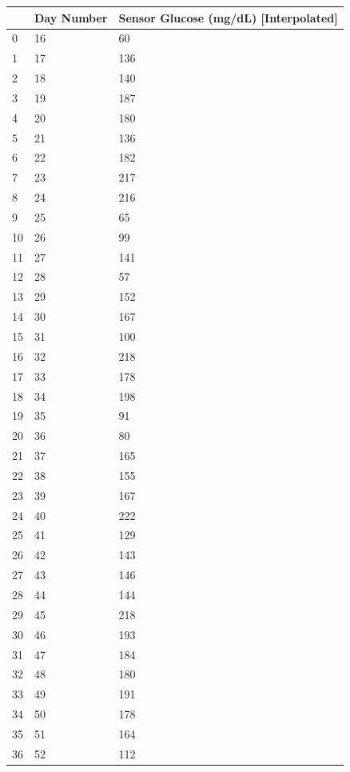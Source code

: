 \bigskip\noindent
\begin{tabular}{p{}p{}p{}}
\toprule
 & Day Number & Sensor Glucose (mg/dL) [Interpolated] \\
\hline
0 & 16 & 60 \\
\hline
1 & 17 & 136 \\
\hline
2 & 18 & 140 \\
\hline
3 & 19 & 187 \\
\hline
4 & 20 & 180 \\
\hline
5 & 21 & 136 \\
\hline
6 & 22 & 182 \\
\hline
7 & 23 & 217 \\
\hline
8 & 24 & 216 \\
\hline
9 & 25 & 65 \\
\hline
10 & 26 & 99 \\
\hline
11 & 27 & 141 \\
\hline
12 & 28 & 57 \\
\hline
13 & 29 & 152 \\
\hline
14 & 30 & 167 \\
\hline
15 & 31 & 100 \\
\hline
16 & 32 & 218 \\
\hline
17 & 33 & 178 \\
\hline
18 & 34 & 198 \\
\hline
19 & 35 & 91 \\
\hline
20 & 36 & 80 \\
\hline
21 & 37 & 165 \\
\hline
22 & 38 & 155 \\
\hline
23 & 39 & 167 \\
\hline
24 & 40 & 222 \\
\hline
25 & 41 & 129 \\
\hline
26 & 42 & 143 \\
\hline
27 & 43 & 146 \\
\hline
28 & 44 & 144 \\
\hline
29 & 45 & 218 \\
\hline
30 & 46 & 193 \\
\hline
31 & 47 & 184 \\
\hline
32 & 48 & 180 \\
\hline
33 & 49 & 191 \\
\hline
34 & 50 & 178 \\
\hline
35 & 51 & 164 \\
\hline
36 & 52 & 112 \\

\end{tabular}
